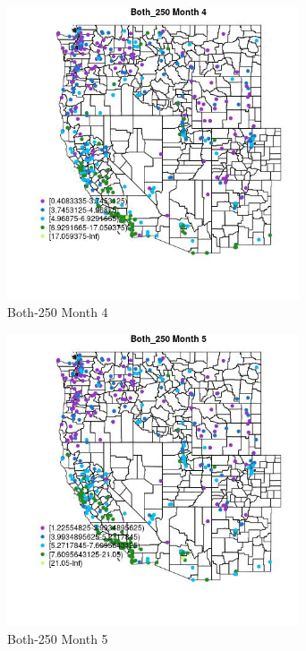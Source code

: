 \begin{figure} 
\centering  
\includegraphics[width=0.77\textwidth]{Code_Outputs/ML_input_report_ML_input_PM25_Step5_part_d_de_duplicated_aves_ML_input_MapObsMo4Both_250.jpg} 
\caption{\label{fig:ML_input_report_ML_input_PM25_Step5_part_d_de_duplicated_aves_ML_inputMapObsMo4Both_250}Both-250 Month 4} 
\end{figure} 
 

\begin{figure} 
\centering  
\includegraphics[width=0.77\textwidth]{Code_Outputs/ML_input_report_ML_input_PM25_Step5_part_d_de_duplicated_aves_ML_input_MapObsMo5Both_250.jpg} 
\caption{\label{fig:ML_input_report_ML_input_PM25_Step5_part_d_de_duplicated_aves_ML_inputMapObsMo5Both_250}Both-250 Month 5} 
\end{figure} 
 

